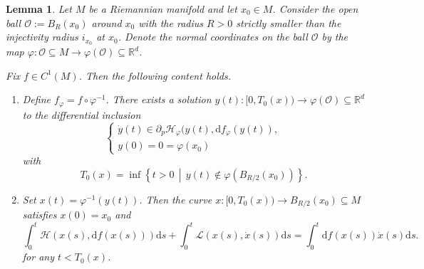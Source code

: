 \documentclass[a4paper]{article}
\newcommand{\cO}{\mathcal{O}}
\newcommand{\bR}{\mathbb{R}}
\numberwithin{equation}{section}
\newtheorem{lemma}[theorem]{Lemma}
\theoremstyle{definition}
\begin{document}
\begin{lemma}\label{lemma:local_existence}
Let $M$ be a Riemannian manifold and let $x_0 \in M$. Consider the open ball $\cO := B_{R}(x_0)$ around $x_0$ with the radius $R > 0$ strictly smaller than the injectivity radius $i_{x_0}$ at $x_0$. Denote the normal coordinates on the ball $\cO$ by the map $\varphi : \cO \subseteq M \rightarrow \varphi(\cO) \subseteq \mathbb{R}^d$.

    Fix $f \in C^1(M)$. Then the following content holds.
    \begin{enumerate}
        \item \label{item:local_existence_on_chart} Define $f_\varphi=f\circ\varphi^{-1}$. There exists a solution $y(t) : [0,T_0(x)) \rightarrow \varphi(\cO) \subseteq \bR^d$ to the differential inclusion
    \begin{equation}\label{eqn_y_differ_inclu}
    \begin{cases}
        \dot{y}(t)\in \partial_p\mathcal{H}_\varphi(y(t),\mathrm{d}f_{\varphi}(y(t)), \\
        y(0) = 0 = \varphi(x_0)
    \end{cases}
	\end{equation}
    with 
    \begin{equation}
        T_0(x) = \inf \left\{ t > 0 \, \middle| \, y(t) \notin \varphi(B_{R/2}(x_0)) \right\}.
    \end{equation}
    \item \label{item:local_existence_integral_equality} Set $x(t) = \varphi^{-1}(y(t))$. Then the curve $x : [0,T_0(x)) \rightarrow B_{R/2}(x_0) \subseteq M$ satisfies $x(0) = x_0$ and
    \begin{equation}\label{eqn_T0V}
	\int^{t}_0\mathcal{H}(x(s),\mathrm{d} f(x(s)))\mathrm{d}s+\int^{t}_0\mathcal{L}(x(s),\dot{x}(s))\mathrm{d}s=\int^{t}_0\mathrm{d}f(x(s))\dot{x}(s)\mathrm{d}s.
	\end{equation}
    for any $t < T_0(x)$.
    \end{enumerate}
\end{lemma}
\end{document}
